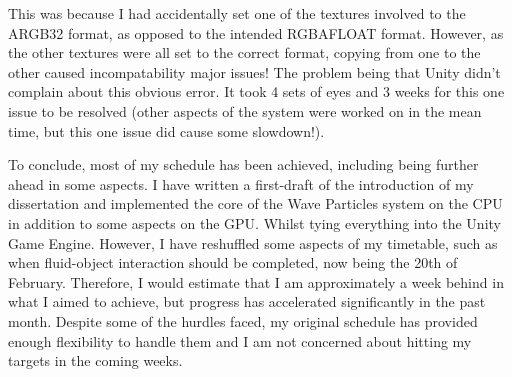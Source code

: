 \documentclass[12pt,a4paper,twoside]{report}
\begin{document}
This was because I had accidentally set one of the textures involved to the
ARGB32 format, as opposed to the intended RGBAFLOAT format. However, as the
other textures were all set to the correct format, copying from one to the other
caused incompatability major issues! The problem being that Unity didn't
complain about this obvious error. It took 4 sets of eyes and 3 weeks for this
one issue to be resolved (other aspects of the system were worked on in the mean
time, but this one issue did cause some slowdown!).

To conclude, most of my schedule has been achieved, including being further
ahead in some aspects. I have written a first-draft of the introduction of my
dissertation and implemented the core of the Wave Particles system on the CPU in
addition to some aspects on the GPU. Whilst tying everything into the Unity Game
Engine. However, I have reshuffled some aspects of my timetable, such as when
fluid-object interaction should be completed, now being the 20th of February.
Therefore, I would estimate that I am approximately a week behind in what I
aimed to achieve, but progress has accelerated significantly in the past month.
Despite some of the hurdles faced, my original schedule has provided enough
flexibility to handle them and I am not concerned about hitting my targets in
the coming weeks.
\end{document}
